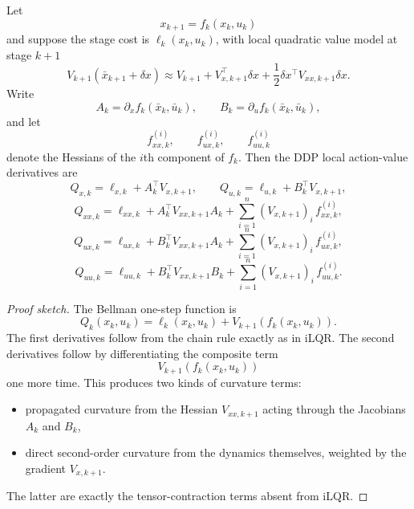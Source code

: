 \begin{proposition}\label{prop:l8-full-second-order-q-function-derivatives-in-ddp}
	Let
	\[
		x_{k+1}=f_k(x_k,u_k)
	\]
	and suppose the stage cost is $\ell_k(x_k,u_k)$, with local quadratic value model at stage $k+1$
	\[
		V_{k+1}(\bar x_{k+1}+\delta x)
		\approx
		V_{k+1}
		+
		V_{x,k+1}^\top \delta x
		+
		\frac{1}{2}\delta x^\top V_{xx,k+1}\delta x.
	\]
	Write
	\[
		A_k=\partial_x f_k(\bar x_k,\bar u_k),
		\qquad
		B_k=\partial_u f_k(\bar x_k,\bar u_k),
	\]
	and let
	\[
		f_{xx,k}^{(i)},
		\qquad
		f_{ux,k}^{(i)},
		\qquad
		f_{uu,k}^{(i)}
	\]
	denote the Hessians of the $i$th component of $f_k$. Then the DDP local action-value derivatives are
	\[
		Q_{x,k} = \ell_{x,k} + A_k^\top V_{x,k+1},
		\qquad
		Q_{u,k} = \ell_{u,k} + B_k^\top V_{x,k+1},
	\]
	\[
		Q_{xx,k}
		=
		\ell_{xx,k}+A_k^\top V_{xx,k+1}A_k
		+
		\sum_{i=1}^{n}(V_{x,k+1})_i\,f_{xx,k}^{(i)},
	\]
	\[
		Q_{ux,k}
		=
		\ell_{ux,k}+B_k^\top V_{xx,k+1}A_k
		+
		\sum_{i=1}^{n}(V_{x,k+1})_i\,f_{ux,k}^{(i)},
	\]
	\[
		Q_{uu,k}
		=
		\ell_{uu,k}+B_k^\top V_{xx,k+1}B_k
		+
		\sum_{i=1}^{n}(V_{x,k+1})_i\,f_{uu,k}^{(i)}.
	\]
\end{proposition}
\begin{proof}[Proof sketch]
	The Bellman one-step function is
	\[
		Q_k(x_k,u_k)=\ell_k(x_k,u_k)+V_{k+1}(f_k(x_k,u_k)).
	\]
	The first derivatives follow from the chain rule exactly as in iLQR. The second derivatives follow by differentiating the composite term
	\[
		V_{k+1}(f_k(x_k,u_k))
	\]
	one more time. This produces two kinds of curvature terms:
	\begin{itemize}
		\item propagated curvature from the Hessian $V_{xx,k+1}$ acting through the Jacobians $A_k$ and $B_k$,
		\item direct second-order curvature from the dynamics themselves, weighted by the gradient $V_{x,k+1}$.
	\end{itemize}
	The latter are exactly the tensor-contraction terms absent from iLQR.
\end{proof}

